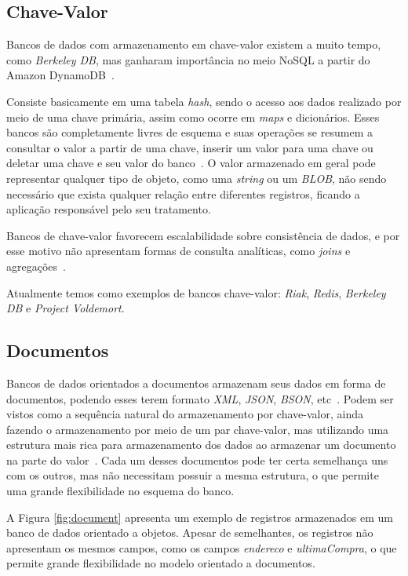 \subsection*{Chave-Valor}
Bancos de dados com armazenamento em chave-valor existem a muito tempo, como \emph{Berkeley DB}, mas ganharam importância no meio NoSQL a partir do Amazon DynamoDB~\cite{chrisnosql}.

Consiste basicamente em uma tabela \emph{hash}, sendo o acesso aos dados realizado por meio de uma chave primária, assim como ocorre em \emph{maps} e dicionários.  Esses bancos são completamente livres de esquema e suas operações se resumem a consultar o valor a partir de uma chave, inserir um valor para uma chave ou deletar uma chave e seu valor do banco~\cite{nosqleval}. O valor armazenado em geral pode representar qualquer tipo de objeto, como uma \emph{string} ou um \emph{BLOB}, não sendo necessário que exista qualquer relação entre diferentes registros, ficando a aplicação responsável pelo seu tratamento. 

Bancos de chave-valor favorecem escalabilidade sobre consistência de dados, e por esse motivo não apresentam formas de consulta analíticas, como \emph{joins} e agregações~\cite{chrisnosql}.

Atualmente temos como exemplos de bancos chave-valor: \emph{Riak}, \emph{Redis}, \emph{Berkeley DB} e \emph{Project Voldemort}.

\subsection*{Documentos}
Bancos de dados orientados a documentos armazenam seus dados em forma de documentos, podendo esses terem formato \emph{XML}, \emph{JSON}, \emph{BSON}, etc~\cite{pramod}. Podem ser vistos como a sequência natural do armazenamento por chave-valor, ainda fazendo o armazenamento por meio de um par chave-valor, mas utilizando uma estrutura mais rica para armazenamento dos dados ao armazenar um documento na parte do valor~\cite{chrisnosql}. Cada um desses documentos pode ter certa semelhança uns com os outros, mas não necessitam possuir a mesma estrutura, o que permite uma grande flexibilidade no esquema do banco.

A Figura \ref{fig:document} apresenta um exemplo de registros armazenados em um banco de dados orientado a objetos. Apesar de semelhantes, os registros não apresentam os mesmos campos, como os campos \emph{endereco} e \emph{ultimaCompra}, o que permite grande flexibilidade no modelo orientado a documentos. 

